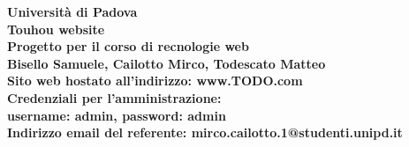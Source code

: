\documentclass[openany, a4paper, 12pt]{report}
\begin{document}
	
	\begin{titlepage}
		\centering
		\vfill
		{
			\bfseries
			\vskip2cm
			\Large Università di Padova\\
			\vfill
			\Huge Touhou website\\
			\Large Progetto per il corso di recnologie web\\
			\vfill
			\large Bisello Samuele, Cailotto Mirco, Todescato Matteo\\
			\vfill
			Sito web hostato all'indirizzo: www.TODO.com\\ %
			Credenziali per l'amministrazione:\\username: admin, password: admin\\
			Indirizzo email del referente: mirco.cailotto.1@studenti.unipd.it\\
			\vfill
		}    
	\end{titlepage}
	\tableofcontents
	\newpage
	
	
	
	
	
\end{document}
